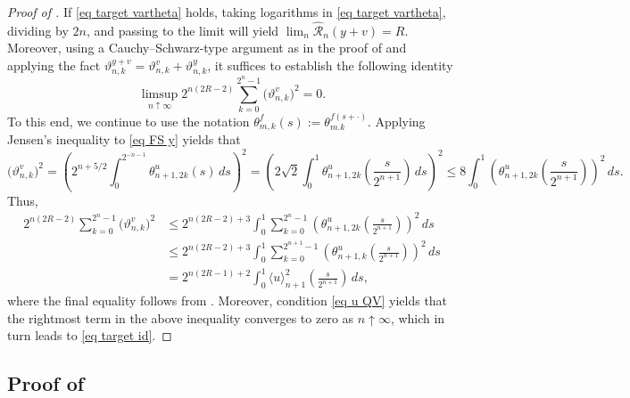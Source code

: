 \documentclass[12pt,reqno]{article}
\def\ua{\uparrow}
\def\wh{\widehat}
\numberwithin{equation}{section}
\def\cR{{\mathscr R}}
\theoremstyle{definition}
\def\<{\langle}
\def\>{\rangle}
\def\ua{\uparrow}
\def\wh{\widehat}
\begin{document}
\begin{proof}[Proof of ]
	 If \eqref{eq target vartheta} holds, taking logarithms in \eqref{eq target vartheta}, dividing by $2n$, and passing to the limit will yield $\lim_n \wh \cR_n(y+v)  = R$. Moreover, using a Cauchy--Schwarz-type argument as in the proof of  and applying the fact $\vartheta^{y + v}_{n,k} = \vartheta^v_{n,k} + \vartheta^y_{n,k}$, it suffices to establish the following identity
	\begin{equation}\label{eq target id}
		\limsup_{n \ua \infty} 2^{n(2R-2)}\sum_{k = 0}^{2^n-1}\big(\vartheta^v_{n,k}\big)^2 = 0.
	\end{equation} To this end, we continue to use the notation $\theta_{m,k}^f(s):=\theta_{m.k}^{f(s+\cdot)}$. Applying Jensen's inequality to \eqref{eq FS y} yields that 
	\begin{equation*}
		\big(\vartheta^{v}_{n,k}\big)^2 = \left(2^{n + 5/2}\int_{0}^{2^{-n-1}}\theta^{u}_{n+1,2k}(s)\,ds\right)^2 = \left(2\sqrt{2}\int_0^{1}\theta^u_{n+1,2k}\left(\frac{s}{2^{n+1}}\right)\,ds\right)^2 \le 8 \int_0^1 \left(\theta^u_{n+1,2k}\left(\frac{s}{2^{n+1}}\right)\right)^2\,ds.
	\end{equation*}
	Thus, 
	\begin{equation*}
		\begin{split}
			2^{n(2R-2)}\sum_{k = 0}^{2^n-1}\big(\vartheta^{v}_{n,k}\big)^2 &\le 2^{n(2R-2)+3}\int_0^1 \sum_{k = 0}^{2^n-1}\left(\theta^u_{n+1,2k}\left(\frac{s}{2^{n+1}}\right)\right)^2\,ds\\ &\le 2^{n(2R-2)+3}\int_0^1 \sum_{k = 0}^{2^{n+1}-1}\left(\theta^u_{n+1,k}\left(\frac{s}{2^{n+1}}\right)\right)^2\,ds \\&= 2^{n(2R-1)+2}\int_0^1 \<u\>^{2}_{n+1}\left(\frac{s}{2^{n+1}}\right)\,ds,
		\end{split}
	\end{equation*}
	where the final equality follows from \cite[Proposition 2.1]{MishuraSchied}. Moreover, condition \eqref{eq u QV} yields that the rightmost term  in the above inequality converges to zero as $n \ua \infty$, which in turn leads to \eqref{eq target id}. 
\end{proof}


\subsection{Proof of }\label{Section Proof fbm}
\end{document}
